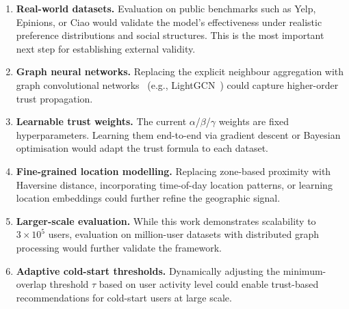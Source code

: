 \documentclass[conference]{IEEEtran}
\begin{document}
\begin{enumerate}
  \item \textbf{Real-world datasets.}  Evaluation on public benchmarks
        such as Yelp, Epinions, or Ciao would validate the model's
        effectiveness under realistic preference distributions and social
        structures.  This is the most important next step for
        establishing external validity.

  \item \textbf{Graph neural networks.}  Replacing the explicit
        neighbour aggregation with graph convolutional
        networks~\cite{kipf2017semi} (e.g., LightGCN~\cite{he2020lightgcn})
        could capture higher-order trust propagation.

  \item \textbf{Learnable trust weights.}  The current $\alpha$/$\beta$/$\gamma$
        weights are fixed hyperparameters.  Learning them end-to-end via
        gradient descent or Bayesian optimisation would adapt the trust
        formula to each dataset.

  \item \textbf{Fine-grained location modelling.}  Replacing zone-based
        proximity with Haversine distance, incorporating time-of-day
        location patterns, or learning location embeddings could further
        refine the geographic signal.

  \item \textbf{Larger-scale evaluation.}  While this work demonstrates
        scalability to $3 \times 10^5$ users, evaluation on million-user
        datasets with distributed graph processing would further validate
        the framework.

  \item \textbf{Adaptive cold-start thresholds.}  Dynamically adjusting
        the minimum-overlap threshold $\tau$ based on user activity level
        could enable trust-based recommendations for cold-start users
        at large scale.
\end{enumerate}
\end{document}
